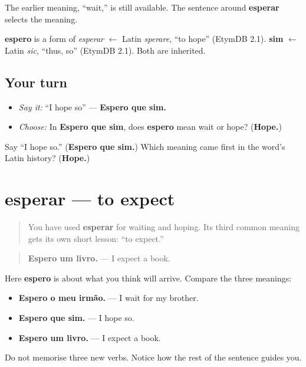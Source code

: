 The earlier meaning, “wait,” is still available. The sentence around \textbf{esperar} selects the meaning.

\begin{cousinweb}
\textbf{espero} is a form of \emph{esperar} $\leftarrow$ Latin \emph{sperare}, \textquotedblleft{}to hope\textquotedblright{} (EtymDB 2.1). \textbf{sim} $\leftarrow$ Latin \emph{sic}, \textquotedblleft{}thus, so\textquotedblright{} (EtymDB 2.1). Both are inherited.
\end{cousinweb}

\subsection*{Your turn}
\begin{itemize}
\raggedright
  \item \emph{Say it:} “I hope so” — \textbf{Espero que sim.}
  \item \emph{Choose:} In \textbf{Espero que sim}, does \textbf{espero} mean wait or hope? (\textbf{Hope.})
\end{itemize}

\begin{tcolorbox}[breakable,colback=teal!4,colframe=teal!35!black,title={Before you move on}]
Say “I hope so.” (\textbf{Espero que sim.}) Which meaning came first in the word’s Latin history? (\textbf{Hope.})
\end{tcolorbox}
\section[esperar]{esperar — to expect}

\label{lesson:PT-C21-esperar-expect}



\begin{quote}
You have used \textbf{esperar} for waiting and hoping. Its third common meaning gets its own short lesson: “to expect.”
\end{quote}

\begin{grammarlens}[title={Grammar Lens: Let the object choose the meaning}]
\begin{quote}
\textbf{Espero um livro.} — I expect a book.
\end{quote}

Here \textbf{espero} is about what you think will arrive. Compare the three meanings:

\begin{itemize}
\raggedright
  \item \textbf{Espero o meu irmão.} — I wait for my brother.
  \item \textbf{Espero que sim.} — I hope so.
  \item \textbf{Espero um livro.} — I expect a book.
\end{itemize}

Do not memorise three new verbs. Notice how the rest of the sentence guides you.
\end{grammarlens}

